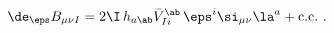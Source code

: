 \begin{equation}\label{susy-tensor}
  \de_\eps B_{\mu\nu I} = 2\I\, h_{a\ab} \bar{V}_{Ii}^\ab\, \eps^i
  \si_{\mu\nu} \la^a + \text{c.c.}\ .
 \end{equation}

